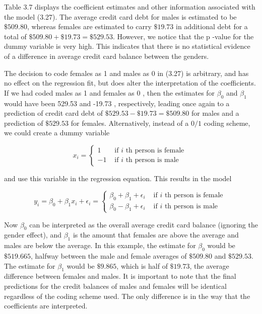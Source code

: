 \documentclass[10pt]{article}
\begin{document}
Table 3.7 displays the coefficient estimates and other information associated with the model (3.27). The average credit card debt for males is estimated to be $\$ 509.80$, whereas females are estimated to carry $\$ 19.73$ in additional debt for a total of $\$ 509.80+\$ 19.73=\$ 529.53$. However, we notice that the p -value for the dummy variable is very high. This indicates that there is no statistical evidence of a difference in average credit card balance between the genders.

The decision to code females as 1 and males as 0 in (3.27) is arbitrary, and has no effect on the regression fit, but does alter the interpretation of the coefficients. If we had coded males as 1 and females as 0 , then the estimates for $\beta_{0}$ and $\beta_{1}$ would have been 529.53 and -19.73 , respectively, leading once again to a prediction of credit card debt of $\$ 529.53-\$ 19.73=\$ 509.80$ for males and a prediction of $\$ 529.53$ for females. Alternatively, instead of a $0 / 1$ coding scheme, we could create a dummy variable

$$
x_{i}= \begin{cases}1 & \text { if } i \text { th person is female } \\ -1 & \text { if } i \text { th person is male }\end{cases}
$$

and use this variable in the regression equation. This results in the model

$$
y_{i}=\beta_{0}+\beta_{1} x_{i}+\epsilon_{i}= \begin{cases}\beta_{0}+\beta_{1}+\epsilon_{i} & \text { if } i \text { th person is female } \\ \beta_{0}-\beta_{1}+\epsilon_{i} & \text { if } i \text { th person is male }\end{cases}
$$

Now $\beta_{0}$ can be interpreted as the overall average credit card balance (ignoring the gender effect), and $\beta_{1}$ is the amount that females are above the average and males are below the average. In this example, the estimate for $\beta_{0}$ would be $\$ 519.665$, halfway between the male and female averages of $\$ 509.80$ and $\$ 529.53$. The estimate for $\beta_{1}$ would be $\$ 9.865$, which is half of $\$ 19.73$, the average difference between females and males. It is important to note that the final predictions for the credit balances of males and females will be identical regardless of the coding scheme used. The only difference is in the way that the coefficients are interpreted.
\end{document}

